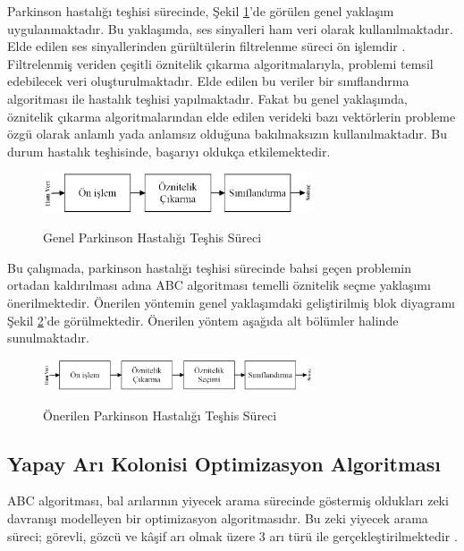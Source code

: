 \documentclass[conference]{IEEEtran}
\begin{document}
Parkinson hastalığı teşhisi sürecinde, Şekil \ref{fig:GPHTS}'de görülen genel yaklaşım uygulanmaktadır. Bu yaklaşımda, ses sinyalleri ham veri olarak kullanılmaktadır. Elde edilen ses sinyallerinden gürültülerin filtrelenme süreci ön işlemdir \cite{ngumuh542973}. Filtrelenmiş veriden çeşitli öznitelik çıkarma algoritmalarıyla, problemi temsil edebilecek veri oluşturulmaktadır. Elde edilen bu veriler bir sınıflandırma algoritması ile hastalık teşhisi yapılmaktadır. Fakat bu genel yaklaşımda, öznitelik çıkarma algoritmalarından elde edilen verideki bazı vektörlerin probleme özgü olarak anlamlı yada anlamsız olduğuna bakılmaksızın kullanılmaktadır. Bu durum hastalık teşhisinde, başarıyı oldukça etkilemektedir. 
%
\begin{figure}[]%
	\centering%
	\includegraphics[width=8cm]{figures/GenelYontem.png}\\
	\caption{Genel Parkinson Hastalığı Teşhis Süreci}%
	\label{fig:GPHTS}%
\end{figure}
%
Bu çalışmada, parkinson hastalığı teşhisi sürecinde bahsi geçen problemin ortadan kaldırılması adına ABC algoritması temelli öznitelik seçme yaklaşımı önerilmektedir. Önerilen yöntemin genel yaklaşımdaki geliştirilmiş blok diyagramı Şekil \ref{fig:OPHTS}'de görülmektedir. Önerilen yöntem aşağıda alt bölümler halinde sunulmaktadır.
%
\begin{figure}[]%
	\centering%
	\includegraphics[width=8cm]{figures/OnerilenYontem.png}\\
	\caption{Önerilen Parkinson Hastalığı Teşhis Süreci}%
	\label{fig:OPHTS}%
\end{figure}

\subsection{Yapay Arı Kolonisi Optimizasyon Algoritması}

ABC algoritması, bal arılarının yiyecek arama sürecinde göstermiş oldukları zeki davranışı modelleyen bir optimizasyon algoritmasıdır. Bu zeki yiyecek arama süreci; görevli, gözcü ve kâşif arı olmak üzere 3 arı türü ile gerçekleştirilmektedir \cite{karaboga2005idea}.
\end{document}
